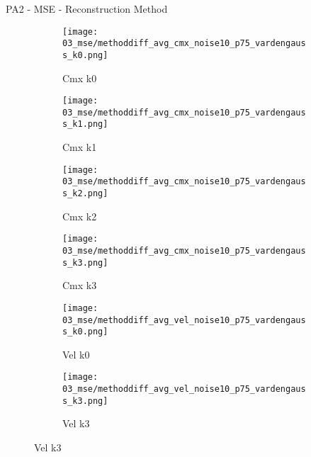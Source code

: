 \documentclass{beamer}
\begin{document}
\begin{frame}{PA2 - MSE - Reconstruction Method}{}
\begin{figure}
\begin{subfigure}{0.24\textwidth}
\texttt{[image: 03\_mse/methoddiff\_avg\_cmx\_noise10\_p75\_vardengauss\_k0.png]}
\vspace{-20pt}
\caption*{\tiny Cmx k0}
\end{subfigure}
\begin{subfigure}{0.24\textwidth}
\texttt{[image: 03\_mse/methoddiff\_avg\_cmx\_noise10\_p75\_vardengauss\_k1.png]}
\vspace{-20pt}
\caption*{\tiny Cmx k1}
\end{subfigure}
\begin{subfigure}{0.24\textwidth}
\texttt{[image: 03\_mse/methoddiff\_avg\_cmx\_noise10\_p75\_vardengauss\_k2.png]}
\vspace{-20pt}
\caption*{\tiny Cmx k2}
\end{subfigure}
\begin{subfigure}{0.24\textwidth}
\texttt{[image: 03\_mse/methoddiff\_avg\_cmx\_noise10\_p75\_vardengauss\_k3.png]}
\vspace{-20pt}
\caption*{\tiny Cmx k3}
\end{subfigure}

\begin{subfigure}{0.49\textwidth}
\texttt{[image: 03\_mse/methoddiff\_avg\_vel\_noise10\_p75\_vardengauss\_k0.png]}
\vspace{-20pt}
\caption*{\tiny Vel k0}
\end{subfigure}
\begin{subfigure}{0.49\textwidth}
\texttt{[image: 03\_mse/methoddiff\_avg\_vel\_noise10\_p75\_vardengauss\_k3.png]}
\vspace{-20pt}
\caption*{\tiny Vel k3}
\end{subfigure}
\end{figure}
\end{frame}
\end{document}
